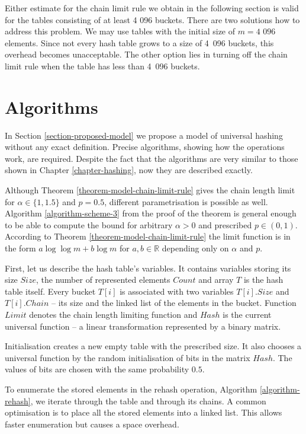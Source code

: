Either estimate for the chain limit rule we obtain in the following section is valid for the tables consisting of at least 4 096 buckets. There are two solutions how to address this problem. We may use tables with the initial size of $m = \text{4~096}$ elements. Since not every hash table grows to a size of 4~096 buckets, this overhead becomes unacceptable. The other option lies in turning off the chain limit rule when the table has less than 4~096 buckets. 

\section{Algorithms}
In Section \ref{section-proposed-model} we propose a model of universal hashing without any exact definition. Precise algorithms, showing how the operations work, are required. Despite the fact that the algorithms are very similar to those shown in Chapter \ref{chapter-hashing}, now they are described exactly.

Although Theorem \ref{theorem-model-chain-limit-rule} gives the chain length limit for $\alpha \in \{1, 1.5\}$ and $p = 0.5$, different parametrisation is possible as well. Algorithm \ref{algorithm-scheme-3} from the proof of the theorem is general enough to be able to compute the bound for arbitrary $\alpha > 0$ and prescribed $p \in (0, 1)$. According to Theorem \ref{theorem-model-chain-limit-rule} the limit function is in the form $a \log \log m + b \log m$ for $a, b \in \mathbb{R}$ depending only on $\alpha$ and $p$.

First, let us describe the hash table's variables. It contains variables storing its size $Size$, the number of represented elements $Count$ and array $T$ is the hash table itself. Every bucket $T[i]$ is associated with two variables $T[i].Size$ and $T[i].Chain$ -- its size and the linked list of the elements in the bucket. Function $Limit$ denotes the chain length limiting function and $Hash$ is the current universal function -- a linear transformation represented by a binary matrix.

Initialisation creates a new empty table with the prescribed size. It also chooses a universal function by the random initialisation of bits in the matrix $Hash$. The values of bits are chosen with the same probability $0.5$.

To enumerate the stored elements in the rehash operation, Algorithm \ref{algorithm-rehash}, we iterate through the table and through its chains. A common optimisation is to place all the stored elements into a linked list. This allows faster enumeration but causes a space overhead.

